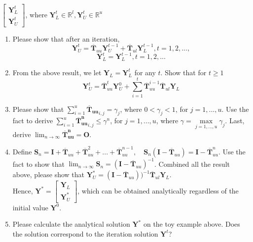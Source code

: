 \documentclass{article}
\begin{document}
$\begin{bmatrix}
\boldsymbol{Y}^{t}_L \\
\boldsymbol{Y}^{t}_U
\end{bmatrix}$, where $\boldsymbol{Y}^{t}_L \in \mathbb{R}^{l}, \boldsymbol{Y}^{t}_U \in \mathbb{R}^{u}$

\begin{enumerate}[resume]
\item Please show that after an iteration,
$$ \boldsymbol{Y}^{t}_U = \boldsymbol{\overline{T}}_{uu} \boldsymbol{Y}^{t-1}_U + \boldsymbol{\overline{T}}_{ul} \boldsymbol{Y}^{t-1}_L, t = 1,2,...,$$
$$\boldsymbol{Y}^{t}_L =  \boldsymbol{Y}^{t-1}_L, t = 1, 2,...$$
\item From the above result, we let $\boldsymbol{Y}_L=\boldsymbol{Y}^{t}_L$ for any $t$. Show that for $t \geq 1$ 
$$ \boldsymbol{Y}^{t}_U = \boldsymbol{\overline{T}}_{uu}^t \boldsymbol{Y}_U^{0} + \sum_{i=1}^t \boldsymbol{\overline{T}}_{uu}^{i-1} \boldsymbol{\overline{T}}_{ul} \boldsymbol{Y}_L$$

\item Please show that $\sum_{i=1}^u \boldsymbol{\overline{T}_{uu}}_{i,j} = \gamma_j$, where $0 < \gamma_j < 1$, for $j=1,...,u$. Use the fact to derive $\sum_{i=1}^u  \boldsymbol{\overline{T}_{uu}^n}_{i,j} \leq \gamma^n$, for $ j=1,...,u$, where $\gamma = \max\limits_{j=1,...,u} \gamma_j $. Last, derive $\lim_{n\to\infty} \boldsymbol{\overline{T}_{uu}^n} = \boldsymbol{O}$.


\item Define $\boldsymbol{S}_n = \boldsymbol{I} + \boldsymbol{\overline{T}}_{uu} + \boldsymbol{\overline{T}}_{uu}^2 + ... + \boldsymbol{\overline{T}}_{uu}^{n-1}, \quad \boldsymbol{S}_n(\boldsymbol{I}-\boldsymbol{\overline{T}}_{uu}) = \boldsymbol{I} - \boldsymbol{\overline{T}}_{uu}^{n}$. Use the fact to show that  
$\lim_{n\to\infty}\boldsymbol{S}_n = (\boldsymbol{I}-\boldsymbol{\overline{T}}_{uu})^{-1}$. Combined all the result above, please show that $\boldsymbol{Y}^{*}_U = (\boldsymbol{I}-\boldsymbol{\overline{T}}_{uu}))^{-1}\boldsymbol{\overline{T}}_{ul} \boldsymbol{Y}_L$. \\
Hence, $\boldsymbol{Y}^{*}=
\begin{bmatrix}
\boldsymbol{Y}_L \\
\boldsymbol{Y}^{*}_U
\end{bmatrix}
$, which can be obtained analytically regardless of the initial value $\boldsymbol{Y}^0$.

\item Please calculate the analytical solution $\boldsymbol{Y}^{*}$ on the toy example above. Does the solution correspond to the iteration solution $\boldsymbol{Y}^{t}$?
\end{enumerate}
\end{document}
